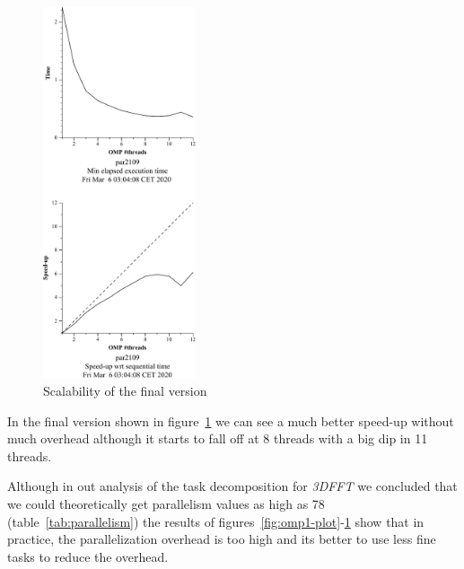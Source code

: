 \begin{figure}[H]%
    \centering
    \includegraphics[width=0.4\textwidth]{./data/3dfft_/3dfft_omp-strong-3.pdf}
    \caption{Scalability of the final version}%
    \label{fig:omp3-plot}
\end{figure}


In the final version
shown in figure~\ref{fig:omp3-plot} we can see a much better speed-up without much overhead although it starts to
fall off at 8 threads with a big dip in 11 threads.

\vspace{2em}

Although in out analysis of the task decomposition for \emph{3DFFT} we concluded that we could theoretically get parallelism values
as high as 78 (table~\ref{tab:parallelism}) the results of figures~\ref{fig:omp1-plot}-\ref{fig:omp3-plot}
show that in practice, the parallelization overhead is too high and its better to use less fine tasks to
reduce the overhead.


